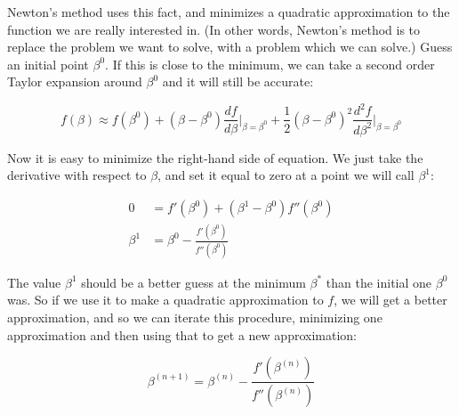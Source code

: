 \documentclass{article}
\begin{document}
Newton's method uses this fact, and minimizes a quadratic approximation to the function we are really interested in. (In other words, Newton's method is to replace the problem we want to solve, with a problem which we can solve.) Guess an initial point $\beta^0$. If this is close to the minimum, we can take a second order Taylor expansion around $\beta^0$ and it will still be accurate:

\[
f(\beta) \approx f(\beta^0) + (\beta - \beta^0) \frac{df}{d\beta} \Bigr|_{\beta = \beta^0} + \frac{1}{2} (\beta - \beta^0)^2 \frac{d^2f}{d\beta^2} \Bigr|_{\beta = \beta^0}
\]

Now it is easy to minimize the right-hand side of equation. We just take the derivative with respect to $\beta$, and set it equal to zero at a point we will call $\beta^1$:

\begin{align*}
0 & = f'(\beta^0) + (\beta^1 - \beta^0)f''(\beta^0) \\
\beta^1 & = \beta^0 - \frac{f'(\beta^0)}{f''(\beta^0)}
\end{align*}

The value $\beta^1$ should be a better guess at the minimum $\beta^{\ast}$ than the initial one $\beta^0$ was. So if we use it to make a quadratic approximation to $f$, we will get a better approximation, and so we can iterate this procedure, minimizing one approximation and then using that to get a new approximation:

\[
\beta^{(n+1)} = \beta^{(n)} - \frac{f'(\beta^{(n)})}{f''(\beta^{(n)})}
\]
\end{document}
